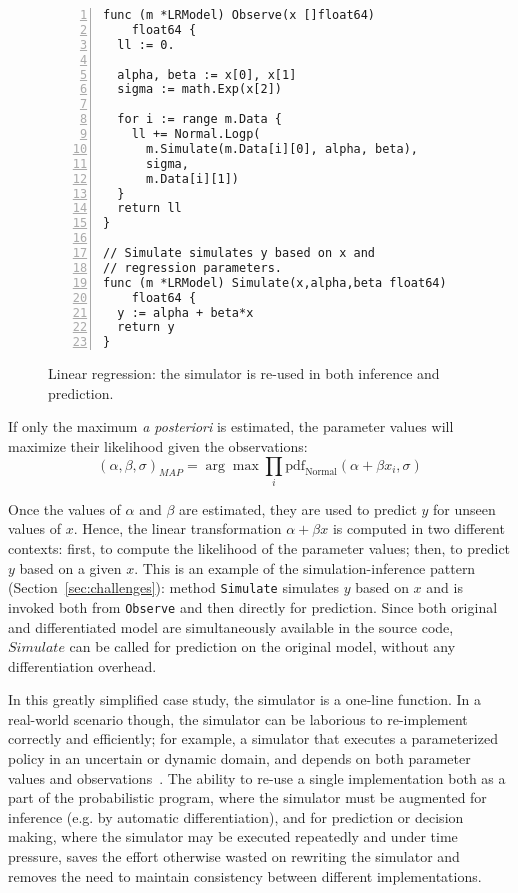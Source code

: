 \documentclass[sigplan,screen]{acmart}
\begin{document}
\begin{sloppypar}
\begin{figure}
\begin{lstlisting}[xleftmargin=11pt,framexleftmargin=10pt,numbers=left]
func (m *LRModel) Observe(x []float64)
    float64 {
  ll := 0.

  alpha, beta := x[0], x[1]
  sigma := math.Exp(x[2])

  for i := range m.Data {
    ll += Normal.Logp(
      m.Simulate(m.Data[i][0], alpha, beta),
      sigma,
      m.Data[i][1])
  }
  return ll
}

// Simulate simulates y based on x and
// regression parameters.
func (m *LRModel) Simulate(x,alpha,beta float64)
    float64 {
  y := alpha + beta*x
  return y
}
\end{lstlisting}
\caption{Linear regression: the simulator is re-used in both
  inference and prediction.}
\label{fig:linear-regression}
\end{figure}
If only the maximum \textit{a posteriori} is estimated, the
parameter values will maximize their likelihood given the
observations:
\begin{equation}
  (\alpha, \beta, \sigma)_{MAP} = \arg \max \prod\limits_i \mathrm{pdf}_\mathrm{Normal}(\alpha + \beta x_i, \sigma)
  \label{eqn:linear-regression-2}
\end{equation}

Once the values of $\alpha$ and $\beta$ are estimated, they are
used to predict $y$ for unseen values of $x$. Hence, the linear
transformation $\alpha + \beta x$ is computed in two different
contexts: first, to compute the likelihood of the parameter
values; then, to predict $y$ based on a given $x$. This is an
example of the simulation-inference pattern
(Section~\ref{sec:challenges}): method \lstinline{Simulate}
simulates $y$ based on $x$ and is invoked both from
\lstinline{Observe} and then directly for prediction.  Since
both original and differentiated model are simultaneously
available in the source code, $Simulate$ can be called
for prediction on the original model, without any
differentiation overhead.

In this greatly simplified case study, the simulator is a
one-line function. In a real-world scenario though, the
simulator can be laborious to re-implement correctly and
efficiently; for example, a simulator that executes a
parameterized policy in an uncertain or dynamic domain, and
depends on both parameter values and observations~\cite{MPT+16}.
The ability to re-use a single implementation both as a part of
the probabilistic program, where the simulator must be augmented
for inference (e.g. by automatic differentiation), and for
prediction or decision making, where the simulator may be
executed repeatedly and under time pressure, saves the effort
otherwise wasted on rewriting the simulator and removes the need
to maintain consistency between different implementations.


\end{sloppypar}
\end{document}
